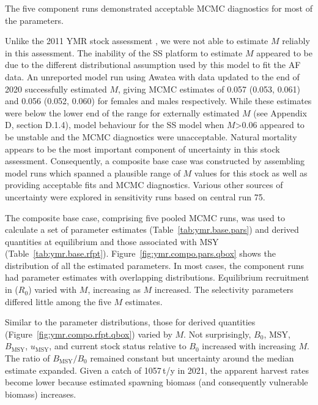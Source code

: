 \documentclass[11pt]{book}
\newcommand{\Bmsy}{B_\text{MSY}}
\newcommand{\umsy}{u_\text{MSY}}
\begin{document}
The five component runs demonstrated acceptable MCMC diagnostics for most of the parameters.

Unlike the 2011 YMR stock assessment \citep{Edwards-etal:2012_ymr}, we were not able to estimate $M$ reliably in this assessment.
The inability of the SS platform to estimate $M$ appeared to be due to the different distributional assumption used by this model to fit the AF data.
An unreported model run using Awatea with data updated to the end of 2020 successfully estimated $M$, giving MCMC estimates of 0.057 (0.053, 0.061) and 0.056 (0.052, 0.060) for females and males respectively.
While these estimates were below the lower end of the range for externally estimated $M$ (see Appendix D, section D.1.4), model behaviour for the SS model when $M$>0.06 appeared to be unstable and the MCMC diagnostics were unacceptable.
Natural mortality appears to be the most important component of uncertainty in this stock assessment.
Consequently, a composite base case was constructed by assembling model runs which spanned a plausible range of $M$ values for this stock as well as providing acceptable fits and MCMC diagnostics.
Various other sources of uncertainty were explored in sensitivity runs based on central run 75.

The composite base case, comprising five pooled MCMC runs, was used to calculate a set of parameter estimates (Table~\ref{tab:ymr.base.pars}) and derived quantities at equilibrium and those associated with MSY (Table~\ref{tab:ymr.base.rfpt}).
Figure~\ref{fig:ymr.compo.pars.qbox} shows the distribution of all the estimated parameters.
In most cases, the component runs had parameter estimates with overlapping distributions.
Equilibrium recruitment in \startYear{} ($R_0$) varied with $M$, increasing as $M$ increased.
The selectivity parameters differed little among the five $M$ estimates.

Similar to the parameter distributions, those for derived quantities (Figure~\ref{fig:ymr.compo.rfpt.qbox}) varied by $M$.
Not surprisingly, $B_0$, MSY, $\Bmsy$, $\umsy$, and current stock status relative to $B_0$ increased with increasing $M$.
The ratio of $\Bmsy/B_0$ remained constant but uncertainty around the median estimate expanded.
Given a catch of 1057\,t/y in 2021, the apparent harvest rates become lower because estimated spawning biomass (and consequently vulnerable biomass) increases.
\end{document}
